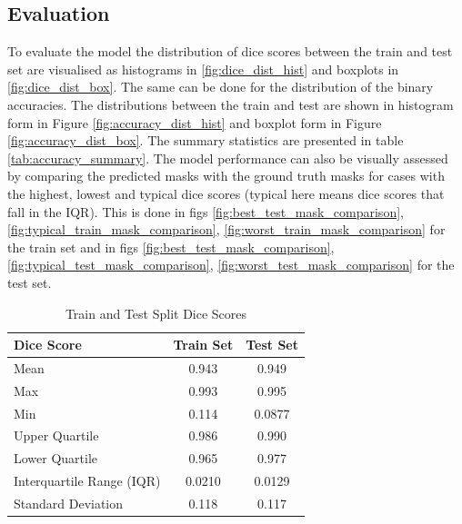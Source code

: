 \documentclass[11pt]{article}
\begin{document}
\subsection{Evaluation}
To evaluate the model the distribution of dice scores between the train and test set are visualised as histograms in \ref{fig:dice_dist_hist} and boxplots in \ref{fig:dice_dist_box}. The same can be done for the distribution of the binary accuracies. The distributions between the train and test are shown in histogram form in Figure \ref{fig:accuracy_dist_hist} and boxplot form in Figure \ref{fig:accuracy_dist_box}. The summary statistics are presented in table \ref{tab:accuracy_summary}.
The model performance can also be visually assessed by comparing the predicted masks with the ground truth masks for cases with the highest, lowest and typical dice scores (typical here means dice scores that fall in the IQR). This is done in figs \ref{fig:best_test_mask_comparison}, \ref{fig:typical_train_mask_comparison}, \ref{fig:worst_train_mask_comparison} for the train set and in figs \ref{fig:best_test_mask_comparison}, \ref{fig:typical_test_mask_comparison}, \ref{fig:worst_test_mask_comparison} for the test set.

\begin{table}[H]
    \centering
    \begin{tabular}{lcc}
    \hline
    \textbf{Dice Score}          & \textbf{Train Set} & \textbf{Test Set} \\ \hline
    Mean         & 0.943          & 0.949         \\
    Max           & 0.993           & 0.995          \\
    Min          & 0.114           & 0.0877          \\
    Upper Quartile           & 0.986           & 0.990          \\
    Lower Quartile           & 0.965           & 0.977          \\
    Interquartile Range (IQR) & 0.0210           & 0.0129          \\
    Standard Deviation       & 0.118           & 0.117          \\ \hline
    \end{tabular}
    \caption{Train and Test Split Dice Scores}

    \label{tab:dice_scores}
\end{table}
    
\end{document}
